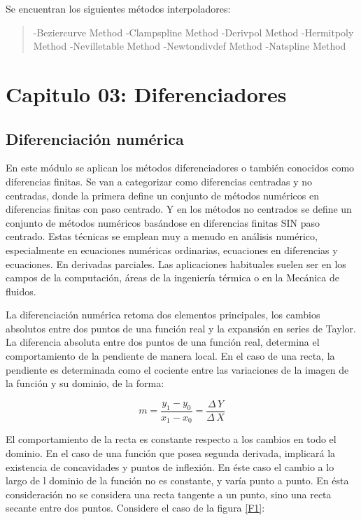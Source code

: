 \documentclass[letterpaper,10pt,oneside]{sphinxmanual}
\theoremstyle{plain}%
\theoremstyle{definition}%
\theoremstyle{remark}%
\begin{document}
Se encuentran los siguientes métodos interpoladores:
\begin{quote}

-Beziercurve Method
-Clampspline Method
-Derivpol Method
-Hermitpoly Method
-Nevilletable Method
-Newtondivdef Method
-Natspline Method
\end{quote}


\chapter{Capitulo 03: Diferenciadores}
\label{chapter03::doc}\label{chapter03:capitulo-03-diferenciadores}

\section{Diferenciación numérica}
\label{chapter03:Diferenciación numérica}

En este módulo se aplican los métodos diferenciadores o también conocidos como diferencias finitas. Se van a categorizar como diferencias centradas y no centradas, donde la primera define un conjunto de métodos numéricos en diferencias finitas con paso centrado. Y en los métodos no centrados se define un conjunto de métodos numéricos basándose en diferencias finitas SIN paso centrado.
Estas técnicas se emplean muy a menudo en análisis numérico, especialmente en ecuaciones numéricas ordinarias, ecuaciones en diferencias y ecuaciones.
En derivadas parciales. Las aplicaciones habituales suelen ser en los campos de la computación, áreas de la ingeniería térmica o en la Mecánica de fluidos.

La diferenciación numérica retoma dos elementos principales, los cambios absolutos entre dos puntos de una función real y la expansión en series de Taylor. La diferencia absoluta entre dos puntos de una función real, determina el comportamiento de la pendiente de manera local.  En el caso de una recta, la pendiente es determinada como el cociente entre las variaciones de la imagen de la función y su dominio, de la forma:

\begin{equation}
m = \frac{y_{1} - y_{0}}{x_{1} - x_{0}} = \frac{\Delta\,Y}{\Delta\,X}
\end{equation}

El comportamiento de la recta es constante respecto a los cambios en todo el dominio. En el caso de una función que posea segunda derivada, implicará la existencia de concavidades y puntos de inflexión. En éste caso el cambio a lo largo de l dominio de la función no es constante, y varía punto a punto. En ésta consideración no se considera una recta tangente a un punto, sino una recta secante entre dos puntos. Considere el caso de la figura \ref{F1}:
\end{document}
